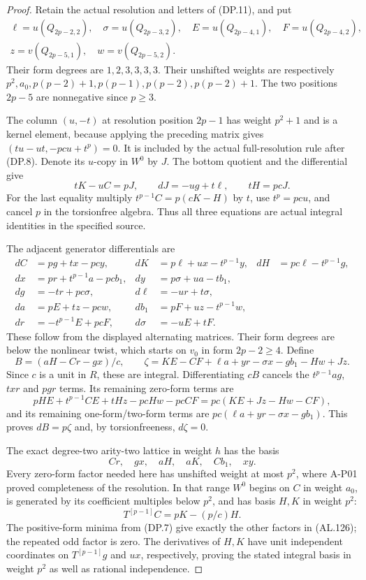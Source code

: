\begin{proof}
Retain the actual resolution and letters of (DP.11), and put
\[
\begin{gathered}
 \ell=u(Q_{2p-2,2}),\quad \sigma=u(Q_{2p-3,2}),\quad
 E=u(Q_{2p-4,1}),\quad F=u(Q_{2p-4,2}),\\
 z=v(Q_{2p-5,1}),\quad w=v(Q_{2p-5,2}).
\end{gathered}
\]
Their form degrees are $1,2,3,3,3,3$.
Their unshifted weights are respectively
$p^2,a_0,p(p-2)+1,p(p-1),p(p-2),p(p-2)+1$.
The two positions $2p-5$ are nonnegative since $p\geq3$.

The column $(u,-t)$ at resolution position $2p-1$ has
weight $p^2+1$ and is a kernel element, because applying
the preceding matrix gives $(tu-ut,-pcu+t^p)=0$.
It is included by the actual full-resolution rule after
(DP.8). Denote its $u$-copy in $W^0$ by $J$.
The bottom quotient and the differential give
\[
              tK-uC=pJ,\qquad dJ=-ug+t\ell,
                      \qquad tH=pcJ.
 \tag{AL.123}
\]
For the last equality multiply $t^{p-1}C=p(cK-H)$
by $t$, use $t^p=pcu$, and cancel $p$ in the
torsionfree algebra. Thus all three equations are
actual integral identities in the specified source.

The adjacent generator differentials are
\[
\begin{aligned}
dC&=pg+tx-pcy,&dK&=p\ell+ux-t^{p-1}y,
       &dH&=pc\ell-t^{p-1}g,\\
dx&=pr+t^{p-1}a-pcb_1,&dy&=p\sigma+ua-tb_1,\\
dg&=-tr+pc\sigma,&d\ell&=-ur+t\sigma,\\
da&=pE+tz-pcw,&db_1&=pF+uz-t^{p-1}w,\\
dr&=-t^{p-1}E+pcF,&d\sigma&=-uE+tF.
\end{aligned}
 \tag{AL.124}
\]
These follow from the displayed alternating matrices.
Their form degrees are below the nonlinear twist, which
starts on $v_0$ in form $2p-2\geq4$.
Define
\[
 B=(aH-Cr-gx)/c,\qquad
 \zeta=KE-CF+\ell a+yr-\sigma x-gb_1-Hw+Jz.
 \tag{AL.125}
\]
Since $c$ is a unit in $R$, these are integral.
Differentiating $cB$ cancels the $t^{p-1}ag$, $txr$
and $pgr$ terms. Its remaining zero-form terms are
\[
 pHE+t^{p-1}CE+tHz-pcHw-pcCF
                    =pc(KE+Jz-Hw-CF),
\]
and its remaining one-form/two-form terms are
$pc(\ell a+yr-\sigma x-gb_1)$.
This proves $dB=p\zeta$ and, by torsionfreeness,
$d\zeta=0$.

The exact degree-two arity-two lattice in weight $h$ has
the basis
\[
                     Cr,\quad gx,\quad aH,\quad aK,
                                  \quad Cb_1,\quad xy.
 \tag{AL.126}
\]
Every zero-form factor needed here has unshifted weight at
most $p^2$, where A-P01 proved completeness of the resolution.
In that range $W^0$ begins on $C$ in weight $a_0$,
is generated by its coefficient multiples below $p^2$,
and has basis $H,K$ in weight $p^2$:
\[
                     T^{[p-1]}C=pK-(p/c)H.
\]
The positive-form minima from (DP.7) give exactly the other
factors in (AL.126); the repeated odd factor is zero.
The derivatives of $H,K$ have unit independent coordinates
on $T^{[p-1]}g$ and $ux$, respectively, proving the stated
integral basis in weight $p^2$ as well as rational independence.


\end{proof}
